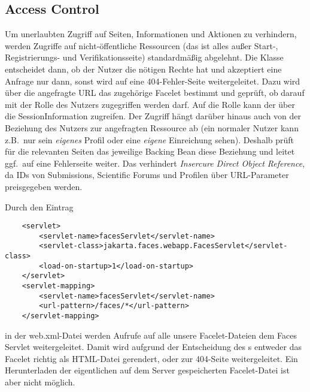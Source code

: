 \subsection{Access Control}\label{subsec:access-control}
Um unerlaubten Zugriff auf Seiten, Informationen und Aktionen zu verhindern, werden Zugriffe auf nicht-öffentliche Ressourcen (das ist alles außer Start-, Registrierungs- und Verifikationsseite) standardmäßig abgelehnt.
Die Klasse  entscheidet dann, ob der Nutzer die nötigen Rechte hat und akzeptiert eine Anfrage nur dann, sonst wird auf eine 404-Fehler-Seite weitergeleitet.
Dazu wird über die angefragte URL das zugehörige Facelet bestimmt und geprüft, ob darauf mit der Rolle des Nutzers zugegriffen werden darf.
Auf die Rolle kann der  über die SessionInformation zugreifen.
Der Zugriff hängt darüber hinaus auch von der Beziehung des Nutzers zur angefragten Ressource ab (ein normaler Nutzer kann z.B.\ nur sein \emph{eigenes} Profil oder eine \emph{eigene} Einreichung sehen).
Deshalb prüft für die relevanten Seiten das jeweilige Backing Bean diese Beziehung und leitet ggf.\ auf eine Fehlerseite weiter.
Das verhindert \emph{Insercure Direct Object Reference}, da IDs von Submissions, Scientific Forums und Profilen über URL-Parameter preisgegeben werden.

Durch den Eintrag
\begin{lstlisting}
    <servlet>
        <servlet-name>facesServlet</servlet-name>
        <servlet-class>jakarta.faces.webapp.FacesServlet</servlet-class>
        <load-on-startup>1</load-on-startup>
    </servlet>
    <servlet-mapping>
        <servlet-name>facesServlet</servlet-name>
        <url-pattern>/faces/*</url-pattern>
    </servlet-mapping>
\end{lstlisting}
in der web.xml-Datei werden Aufrufe auf alle unsere Facelet-Dateien dem Faces Servlet weitergeleitet.
Damit wird aufgrund der Entscheidung des s entweder das Facelet richtig als HTML-Datei gerendert, oder zur 404-Seite weitergeleitet. Ein Herunterladen der eigentlichen auf dem Server gespeicherten Facelet-Datei ist aber nicht möglich.